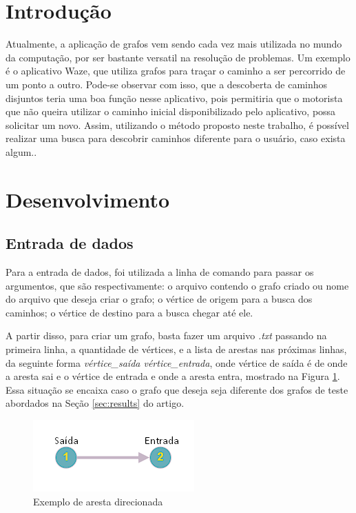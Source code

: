 \section{Introdução}
Atualmente, a aplicação de grafos vem sendo cada vez mais utilizada no mundo da computação, por ser bastante versatil na resolução de problemas. Um exemplo é o aplicativo Waze, que utiliza grafos para traçar o caminho a ser percorrido de um ponto a outro. Pode-se observar com isso, que a descoberta de caminhos disjuntos teria uma boa função nesse aplicativo, pois permitiria que o motorista que não queira utilizar o caminho inicial disponibilizado pelo aplicativo, possa solicitar um novo. Assim, utilizando o método proposto neste trabalho, é possível realizar uma busca para descobrir caminhos diferente para o usuário, caso exista algum..

\section{Desenvolvimento}

\subsection{Entrada de dados}
Para a entrada de dados, foi utilizada a linha de comando para passar os argumentos, que são respectivamente: o arquivo contendo o grafo criado ou nome do arquivo que deseja criar o grafo; o vértice de origem para a busca dos caminhos; o vértice de destino para a busca chegar até ele.

A partir disso, para criar um grafo, basta fazer um arquivo \emph{.txt} passando na primeira linha, a quantidade de vértices, e a lista de arestas nas próximas linhas, da seguinte forma \emph{vértice\_saída vértice\_entrada}, onde vértice de saída é de onde a aresta sai e o vértice de entrada e onde a aresta entra, mostrado na Figura \ref{fig:figure1}. Essa situação se encaixa caso o grafo que deseja seja diferente dos grafos de teste abordados na Seção \ref{sec:results} do artigo.

\begin{figure}[ht]
    \centering
    \includegraphics[width=.3\textwidth]{figuras/aresta_example.png}
    \caption{Exemplo de aresta direcionada}
    \label{fig:figure1}
\end{figure}

